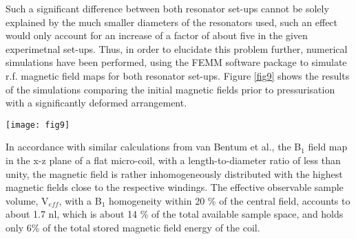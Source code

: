 \documentclass[aip,rsi,reprint,graphicx]{revtex4-1} %
\begin{document}
Such a significant difference between both resonator set-ups cannot be solely explained by the much smaller diameters of the resonators used, such an effect would only account for an increase of a factor of about five in the given experimetnal set-ups. Thus, in order to elucidate this problem further, numerical simulations have been performed, using the FEMM software package to simulate r.f. magnetic field maps for both resonator set-ups. Figure \ref{fig9} shows the results of the simulations comparing the initial magnetic fields prior to pressurisation with a significantly deformed arrangement.\\
\begin{figure*}[htbp]
  \texttt{[image: fig9]}%
 \caption{ \label{fig9} Magnetic field maps of the B$_1$ fields generated by a micro-coil of four turns (400$\mu m$ in diameter and 100 $\mu m$ in height, left), and of a flat Lenz lens made from a solid sheet of gold foil (right). Above the initial configurations, the figure shows two deformed set-ups at a stage where the initial height and diameter of the sample cavity are reduced by 50\%, occuring well below 10 GPa when bigger CuBe gaskets were used\cite{Meier2016}. Using flat rhenium gaskets, this state of deformation typically occurs at substantially higher pressures. Indicated as an overlay are the geometries of both r.f. resonators and the corresponding gaskets. The deformed state of the micro-coil was reproduced from a photograph of an opened pressure cell working up to 6 GPa. Different gasket materials where used in both set-ups, which were also included in the simulations.  The initial parameters \--- operating frequency and circuit currents \--- where adjusted to the experimental parameters with which the spectra of figure \ref{fig567}c where recorded. The dotted lines represent the effective observable sample volume V$_\text{eff}$.}
 \end{figure*}
In accordance with similar calculations from van Bentum et al.\cite{VanBentum2007}, the B$_1$ field map in the x-z plane of a flat micro-coil, with a length-to-diameter ratio of less than unity, the magnetic field is rather inhomogeneously distributed with the highest magnetic fields close to the respective windings. The effective observable sample volume, V$_{eff}$, with a B$_1$ homogeneity within 20 \% of the central field, accounts to about 1.7 nl, which is about 14 \% of the total available sample space, and holds only 6\% of the total stored magnetic field energy of the coil.
\end{document}
